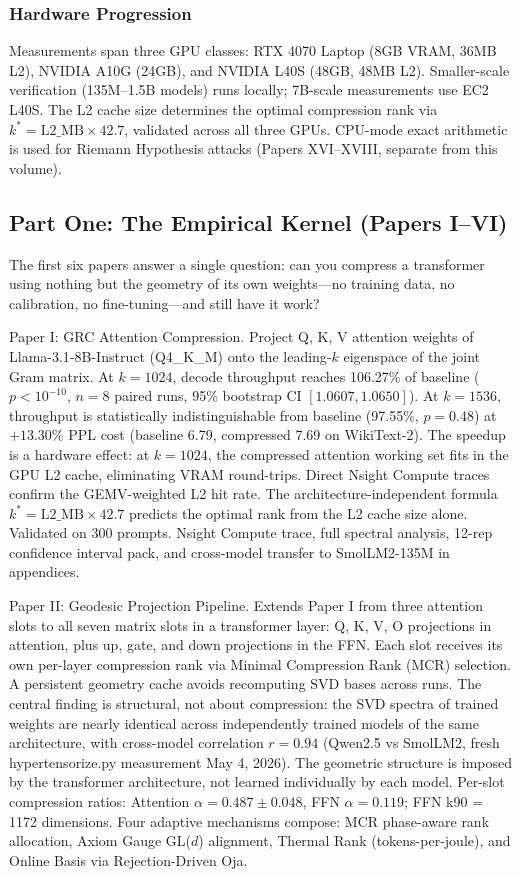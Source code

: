 \documentclass[11pt]{article}
\begin{document}
\subsubsection*{Hardware Progression}
Measurements span three GPU classes: RTX 4070 Laptop (8GB VRAM, 36MB L2), NVIDIA A10G (24GB), and NVIDIA L40S (48GB, 48MB L2). Smaller-scale verification (135M--1.5B models) runs locally; 7B-scale measurements use EC2 L40S. The L2 cache size determines the optimal compression rank via $k^* = \mathrm{L2\_MB} \times 42.7$, validated across all three GPUs. CPU-mode exact arithmetic is used for Riemann Hypothesis attacks (Papers XVI--XVIII, separate from this volume).

\subsection*{Part One: The Empirical Kernel (Papers I--VI)}

The first six papers answer a single question: can you compress a transformer using nothing but the geometry of its own weights---no training data, no calibration, no fine-tuning---and still have it work?

Paper I: GRC Attention Compression. Project Q, K, V attention weights of Llama-3.1-8B-Instruct (Q4\_K\_M) onto the leading-$k$ eigenspace of the joint Gram matrix. At $k=1024$, decode throughput reaches 106.27\% of baseline ($p < 10^{-10}$, $n=8$ paired runs, 95\% bootstrap CI $[1.0607, 1.0650]$). At $k=1536$, throughput is statistically indistinguishable from baseline (97.55\%, $p=0.48$) at $+13.30\%$ PPL cost (baseline 6.79, compressed 7.69 on WikiText-2). The speedup is a hardware effect: at $k=1024$, the compressed attention working set fits in the GPU L2 cache, eliminating VRAM round-trips. Direct Nsight Compute traces confirm the GEMV-weighted L2 hit rate. The architecture-independent formula $k^* = \mathrm{L2\_MB} \times 42.7$ predicts the optimal rank from the L2 cache size alone. Validated on 300 prompts. Nsight Compute trace, full spectral analysis, 12-rep confidence interval pack, and cross-model transfer to SmolLM2-135M in appendices.

Paper II: Geodesic Projection Pipeline. Extends Paper I from three attention slots to all seven matrix slots in a transformer layer: Q, K, V, O projections in attention, plus up, gate, and down projections in the FFN. Each slot receives its own per-layer compression rank via Minimal Compression Rank (MCR) selection. A persistent geometry cache avoids recomputing SVD bases across runs. The central finding is structural, not about compression: the SVD spectra of trained weights are nearly identical across independently trained models of the same architecture, with cross-model correlation $r = 0.94$ (Qwen2.5 vs SmolLM2, fresh hypertensorize.py measurement May 4, 2026). The geometric structure is imposed by the transformer architecture, not learned individually by each model. Per-slot compression ratios: Attention $\alpha = 0.487 \pm 0.048$, FFN $\alpha = 0.119$; FFN k90 = 1172 dimensions. Four adaptive mechanisms compose: MCR phase-aware rank allocation, Axiom Gauge GL($d$) alignment, Thermal Rank (tokens-per-joule), and Online Basis via Rejection-Driven Oja.
\end{document}
